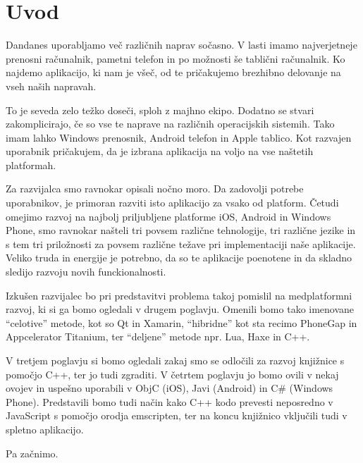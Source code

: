 \graphicspath{{img/}}







\chapter{Uvod}
\label{chap:introduction}


Dandanes uporabljamo več različnih naprav sočasno. V lasti imamo najverjetneje prenosni računalnik, pametni telefon in po možnosti še tablični računalnik. Ko najdemo aplikacijo, ki nam je všeč, od te pričakujemo brezhibno delovanje na vseh naših napravah.

To je seveda zelo težko doseči, sploh z majhno ekipo. Dodatno se stvari zakomplicirajo, če so vse te naprave na različnih operacijskih sistemih. Tako imam lahko Windows prenosnik, Android telefon in Apple tablico. Kot razvajen uporabnik pričakujem, da je izbrana aplikacija na voljo na vse naštetih platformah.

Za razvijalca smo ravnokar opisali nočno moro. Da zadovolji potrebe uporabnikov, je primoran razviti isto aplikacijo za vsako od platform. Četudi omejimo razvoj na najbolj priljubljene platforme iOS, Android in Windows Phone, smo ravnokar našteli tri povsem različne tehnologije, tri različne jezike in s tem tri priložnosti za povsem različne težave pri implementaciji naše aplikacije. Veliko truda in energije je potrebno, da so te aplikacije poenotene in da skladno sledijo razvoju novih funckionalnosti.

Izkušen razvijalec bo pri predstavitvi problema takoj pomislil na medplatformni razvoj, ki si ga bomo ogledali v drugem poglavju. Omenili bomo tako imenovane ``celotive'' metode, kot so Qt in Xamarin, ``hibridne'' kot sta recimo PhoneGap in Appcelerator Titanium, ter ``deljene'' metode npr. Lua, Haxe in C++.

V tretjem poglavju si bomo ogledali zakaj smo se odločili za razvoj knjižnice s pomočjo C++, ter jo tudi zgraditi. V četrtem poglavju jo bomo ovili v nekaj ovojev in uspešno uporabili v ObjC (iOS), Javi (Android) in C\# (Windows Phone). Predstavili bomo tudi način kako C++ kodo prevesti neposredno v JavaScript s pomočjo orodja emscripten, ter na koncu knjižnico vključili tudi v spletno aplikacijo.

Pa začnimo.
